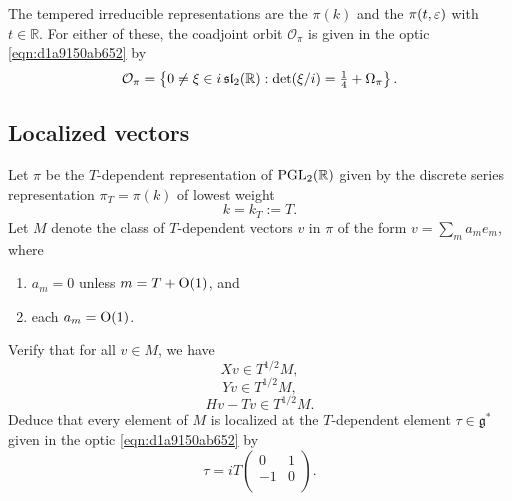 \documentclass[reqno]{amsart} 
\numberwithin{equation}{section}
\begin{document}
The tempered irreducible representations are the $\pi(k)$ and the $\pi(t,\varepsilon)$ with $t \in \mathbb{R}$.  For either of these, the coadjoint orbit $\mathcal{O}_\pi$ is given in the optic \eqref{eqn:d1a9150ab652} by
\begin{equation}\label{eqn:d1a91628a316}
  \mathcal{O}_\pi = \left\{ 0 \neq \xi \in i \operatorname{\mathfrak{s}\mathfrak{l}}_2(\mathbb{R}) :
    \det(\xi/i) =   
    \tfrac{1}{4} + \Omega_\pi     
  \right\}.
\end{equation}

\subsection{Localized vectors}\label{sec:d1a9162ea6e6}

\begin{exercise}\label{exercise:d1aa01c52923}
  Let $\pi$ be the $T$-dependent representation of $\operatorname{PGL}_2(\mathbb{R})$ given by the discrete series representation $\pi_T = \pi(k)$ of lowest weight
  \begin{equation*}
    k = k_T :=T.
  \end{equation*}
  Let $M$ denote the class of $T$-dependent vectors $v$ in $\pi$ of the form $v = \sum_m a_m e_m$, where
  \begin{enumerate}
  \item $a_m = 0$ unless $m = T + \operatorname{O}(1)$, and
  \item each $a_m = \operatorname{O}(1)$.
  \end{enumerate}
  Verify that for all $v \in M$, we have
  \begin{equation*}
    X v \in T^{1/2} M,
  \end{equation*}
  \begin{equation*}
    Y v \in T^{1/2} M,
  \end{equation*}
  \begin{equation*}
    H v - T v \in T^{1/2} M.
  \end{equation*}
  Deduce that every element of $M$ is localized at the $T$-dependent element $\tau \in \mathfrak{g}^*$ given in the optic \eqref{eqn:d1a9150ab652} by
  \begin{equation*}
    \tau =
    i T
    \begin{pmatrix}
      0 & 1 \\
      -1 & 0 \\
    \end{pmatrix}.
  \end{equation*}
\end{exercise}
\end{document}
